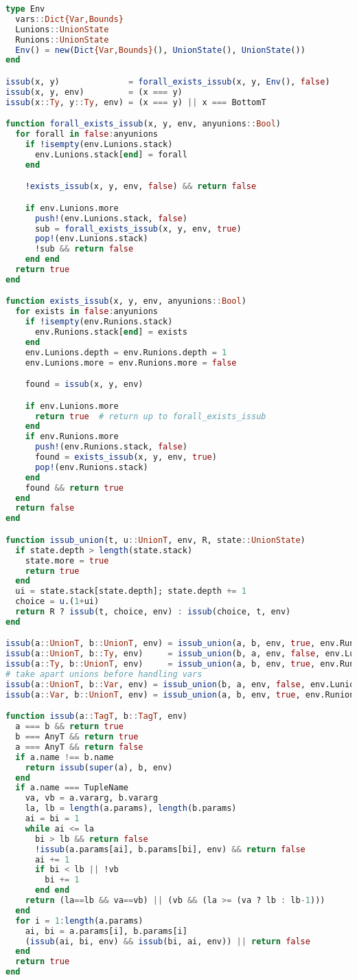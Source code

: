 \begin{singlespace}
\begin{lstlisting}[language=julia]
type Env
  vars::Dict{Var,Bounds}
  Lunions::UnionState
  Runions::UnionState
  Env() = new(Dict{Var,Bounds}(), UnionState(), UnionState())
end

issub(x, y)              = forall_exists_issub(x, y, Env(), false)
issub(x, y, env)         = (x === y)
issub(x::Ty, y::Ty, env) = (x === y) || x === BottomT

function forall_exists_issub(x, y, env, anyunions::Bool)
  for forall in false:anyunions
    if !isempty(env.Lunions.stack)
      env.Lunions.stack[end] = forall
    end

    !exists_issub(x, y, env, false) && return false

    if env.Lunions.more
      push!(env.Lunions.stack, false)
      sub = forall_exists_issub(x, y, env, true)
      pop!(env.Lunions.stack)
      !sub && return false
    end end
  return true
end

function exists_issub(x, y, env, anyunions::Bool)
  for exists in false:anyunions
    if !isempty(env.Runions.stack)
      env.Runions.stack[end] = exists
    end
    env.Lunions.depth = env.Runions.depth = 1
    env.Lunions.more = env.Runions.more = false

    found = issub(x, y, env)

    if env.Lunions.more
      return true  # return up to forall_exists_issub
    end
    if env.Runions.more
      push!(env.Runions.stack, false)
      found = exists_issub(x, y, env, true)
      pop!(env.Runions.stack)
    end
    found && return true
  end
  return false
end

function issub_union(t, u::UnionT, env, R, state::UnionState)
  if state.depth > length(state.stack)
    state.more = true
    return true
  end
  ui = state.stack[state.depth]; state.depth += 1
  choice = u.(1+ui)
  return R ? issub(t, choice, env) : issub(choice, t, env)
end

issub(a::UnionT, b::UnionT, env) = issub_union(a, b, env, true, env.Runions)
issub(a::UnionT, b::Ty, env)     = issub_union(b, a, env, false, env.Lunions)
issub(a::Ty, b::UnionT, env)     = issub_union(a, b, env, true, env.Runions)
# take apart unions before handling vars
issub(a::UnionT, b::Var, env) = issub_union(b, a, env, false, env.Lunions)
issub(a::Var, b::UnionT, env) = issub_union(a, b, env, true, env.Runions)

function issub(a::TagT, b::TagT, env)
  a === b && return true
  b === AnyT && return true
  a === AnyT && return false
  if a.name !== b.name
    return issub(super(a), b, env)
  end
  if a.name === TupleName
    va, vb = a.vararg, b.vararg
    la, lb = length(a.params), length(b.params)
    ai = bi = 1
    while ai <= la
      bi > lb && return false
      !issub(a.params[ai], b.params[bi], env) && return false
      ai += 1
      if bi < lb || !vb
        bi += 1
      end end
    return (la==lb && va==vb) || (vb && (la >= (va ? lb : lb-1)))
  end
  for i = 1:length(a.params)
    ai, bi = a.params[i], b.params[i]
    (issub(ai, bi, env) && issub(bi, ai, env)) || return false
  end
  return true
end


\end{lstlisting}
\end{singlespace}
